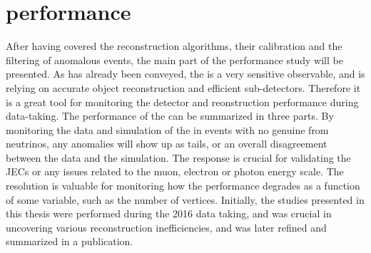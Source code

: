 \section{\ptmiss performance}
\noindent\justify
After having covered the \ptmiss reconstruction algorithms, their calibration and the filtering of anomalous \ptmiss events, the main part of the performance study will be presented. 
As has already been conveyed, the \ptmiss is a very sensitive observable, and is relying on accurate object reconstruction and efficient sub-detectors. 
Therefore it is a great tool for monitoring the detector and reonstruction performance during data-taking. 
The performance of the \ptmiss can be summarized in three parts. 
By monitoring the data and simulation of the \ptmiss in events with no genuine \ptmiss from neutrinos, any anomalies will show up as \ptmiss tails, or an overall disagreement between the data and the simulation. 
The \ptmiss response is crucial for validating the JECs or any issues related to the muon, electron or photon energy scale. 
The \ptmiss resolution is valuable for monitoring how the performance degrades as a function of some variable, such as the number of vertices. 
Initially, the studies presented in this thesis were performed during the 2016 data taking, and was crucial in uncovering various reconstruction inefficiencies, and was later refined and summarized in a publication.  
